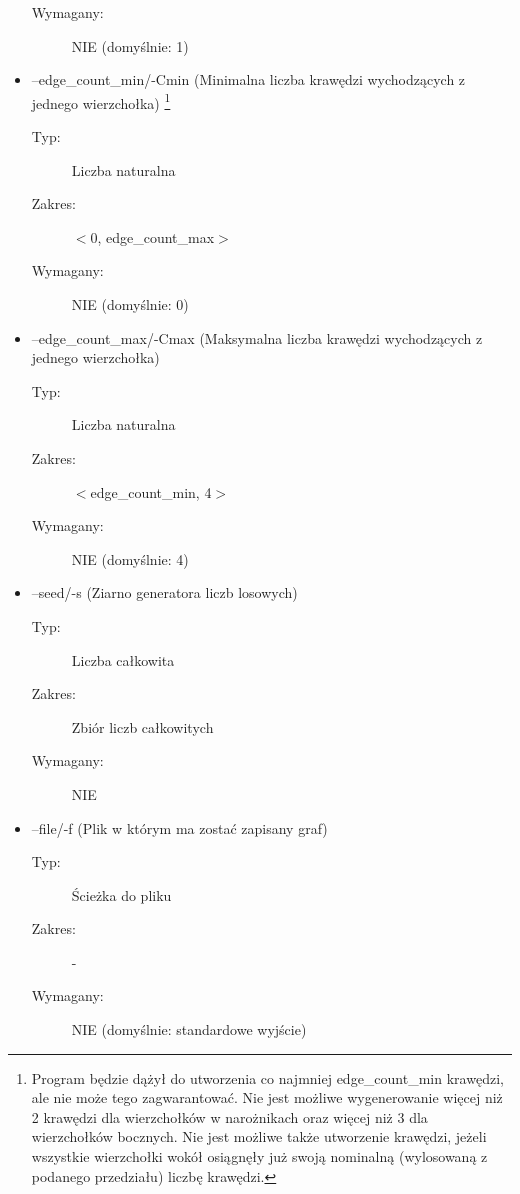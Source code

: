 \documentclass[11pt,a4paper]{report}
\def\console #1{\begingroup\fontfamily{qcr}\selectfont#1\endgroup}
\begin{document}
\begin{itemize}
\begin{description}
            \item[Wymagany:] NIE (domyślnie: 1)
        \end{description}
        \item \console{--edge\_count\_min/-Cmin} (Minimalna liczba krawędzi wychodzących z jednego wierzchołka) \footnote{Program będzie dążył do utworzenia co najmniej \console{edge\_count\_min} krawędzi, ale nie może tego zagwarantować. Nie jest możliwe wygenerowanie więcej niż 2 krawędzi dla wierzchołków w narożnikach oraz więcej niż 3 dla wierzchołków bocznych. Nie jest możliwe także utworzenie krawędzi, jeżeli wszystkie wierzchołki wokół osiągnęły już swoją nominalną (wylosowaną z podanego przedziału) liczbę krawędzi.}
        \begin{description}
            \item[Typ:] Liczba naturalna
            \item[Zakres:] $<$0, \console{edge\_count\_max}$>$
            \item[Wymagany:] NIE (domyślnie: 0)
        \end{description}
        \item \console{--edge\_count\_max/-Cmax} (Maksymalna liczba krawędzi wychodzących z jednego wierzchołka)
        \begin{description}
            \item[Typ:] Liczba naturalna
            \item[Zakres:] $<$\console{edge\_count\_min}, 4$>$
            \item[Wymagany:] NIE (domyślnie: 4)
        \end{description}
        \item \console{--seed/-s} (Ziarno generatora liczb losowych)
        \begin{description}
            \item[Typ:] Liczba całkowita
            \item[Zakres:] Zbiór liczb całkowitych
            \item[Wymagany:] NIE
        \end{description}
        \item \console{--file/-f} (Plik w którym ma zostać zapisany graf)
        \begin{description}
            \item[Typ:] Ścieżka do pliku
            \item[Zakres:] -
            \item[Wymagany:] NIE (domyślnie: standardowe wyjście)
        \end{description}
    \end{itemize}
\end{document}
